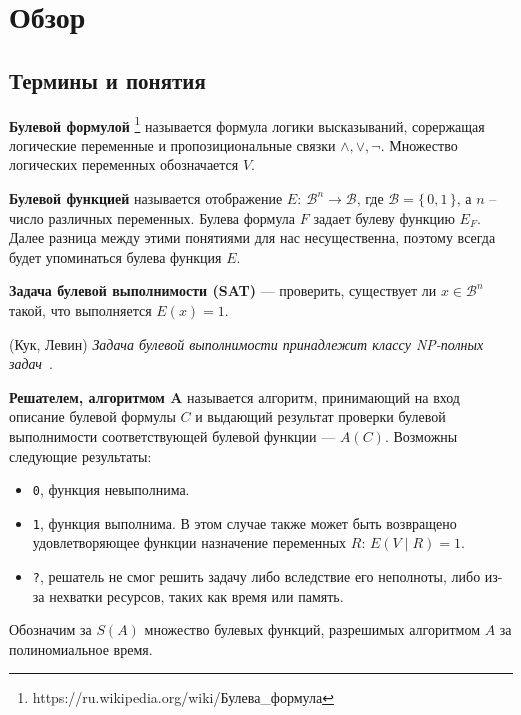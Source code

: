 \chapter{Обзор}\label{overview}


\section{Термины и понятия}\label{overview:terms}


\begin{definition}\label{overview:formula}
    \textbf{Булевой формулой} \footnote{https://ru.wikipedia.org/wiki/Булева\_формула} называется 
    формула логики высказываний, сорержащая логические переменные и пропозициональные связки
    $\wedge, \vee, \neg$. Множество логических переменных обозначается $V$.
\end{definition}

\begin{definition}\label{overview:function}
    \textbf{Булевой функцией} называется отображение $E\colon~ \mathcal{B}^n \to \mathcal{B}$,
    где $\mathcal{B} = \{\, 0, 1 \,\}$, а $n$ -- число различных переменных. Булева формула $F$ 
    задает булеву функцию $E_F$. Далее разница между этими понятиями для нас несущественна, поэтому
    всегда будет упоминаться булева функция $E$.
\end{definition}

\begin{definition}\label{overview:sat}
    \textbf{Задача булевой выполнимости (SAT)} --- проверить, существует ли $x \in \mathcal{B}^n$
    такой, что выполняется $E(x) = 1$.
\end{definition}

\begin{theorem}(Кук, Левин)
    \textit{Задача булевой выполнимости принадлежит классу NP-полных задач}~\cite{bib:cook-levin}.
\end{theorem}

\begin{definition}\label{overview:solver}
    \textbf{Решателем, алгоритмом A} называется алгоритм, принимающий на вход описание булевой формулы $C$
    и выдающий результат проверки булевой выполнимости соответствующей булевой функции --- $A(C)$.
    Возможны следующие результаты:
    \begin{itemize}
        \item \texttt{0}, функция невыполнима.
        \item \texttt{1}, функция выполнима. В этом случае также может быть возвращено
            удовлетворяющее функции назначение переменных $R$: $E(V \mid R) = 1$.
        \item \texttt{?}, решатель не смог решить задачу либо вследствие его неполноты, либо
            из-за нехватки ресурсов, таких как время или память.
    \end{itemize}
    Обозначим за $S(A)$ множество булевых функций, разрешимых алгоритмом $A$ за полиномиальное время.
\end{definition}

